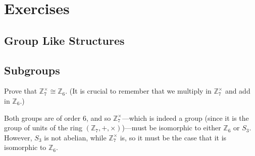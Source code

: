 \section{Exercises} 

\subsection{Group Like Structures}


\subsection{Subgroups}

  \begin{exercise}[Shifrin 6.2.2]
    Prove that $\mathbb{Z}_7^{\times} \cong \mathbb{Z}_6$. (It is crucial to remember that we multiply in $\mathbb{Z}_7^{\times}$ and add in $\mathbb{Z}_6$.)
  \end{exercise}
  \begin{solution}
    Both groups are of order 6, and so $\mathbb{Z}_7^\times$---which is indeed a group (since it is the group of units of the ring $(\mathbb{Z}_7, +, \times)$)---must be isomorphic to either $\mathbb{Z}_6$ or $S_3$. However, $S_3$ is not abelian, while $\mathbb{Z}^\times_7$ is, so it must be the case that it is isomorphic to $\mathbb{Z}_6$. 
  \end{solution}


